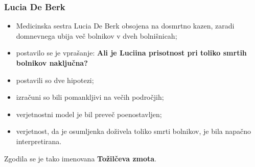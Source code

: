 \documentclass{beamer}
\begin{document}
\begin{frame}
  \frametitle{Lucia De Berk}
\begin{itemize}
  \item Medicinska sestra Lucia De Berk obsojena na dosmrtno kazen, zaradi domnevnega ubija več bolnikov v dveh bolnišnicah;
  \item postavilo se je vprašanje: \textbf{Ali je Luciina prisotnost pri toliko smrtih bolnikov naključna?}
  \item postavili so dve hipotezi;
  \item izračuni so bili pomankljivi na večih področjih;
  \item verjetnostni model je bil preveč poenostavljen;
  \item verjetnost, da je osumljenka doživela toliko smrti bolnikov, je bila napačno interpretirana. \vspace{4mm}
\end{itemize}

Zgodila se je tako imenovana \textbf{Tožilčeva zmota}.
\end{frame}
\end{document}
